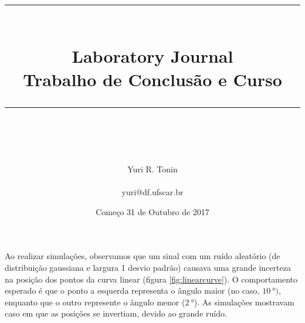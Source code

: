 \documentclass[idxtotoc,hyperref,openany]{labbook} %
\newcommand{\HRule}{\rule{\linewidth}{0.5mm}} %
\begin{document}

\frontmatter %
\title{
\begin{center}
\HRule \\[0.4cm]
{\Huge \bfseries Laboratory Journal \\[0.5cm] \Large Trabalho de Conclusão e Curso}\\[0.4cm] %
\HRule \\[1.5cm]
\end{center}
}
\author{\Huge Yuri R. Tonin \\ \\ \LARGE yuri@df.ufscar.br \\[2cm]} %
\date{Começo 31 de Outubro de 2017} %
\maketitle

\tableofcontents

\mainmatter %













Ao realizar simulações, observamos que um sinal com um ruído aleatório (de distribuição gaussiana e largura 1 desvio padrão) causava uma grande incerteza na posição dos pontos da curva linear (figura \ref{fig:linearcurve}). O comportamento esperado é que o ponto a esquerda representa o ângulo maior (no caso, $\SI{10}{\degree})$, enquanto que o outro represente o ângulo menor ($\SI{2}{\degree}$). As simulações mostravam caso em que as posições se invertiam, devido ao grande ruído. 
\end{document}
